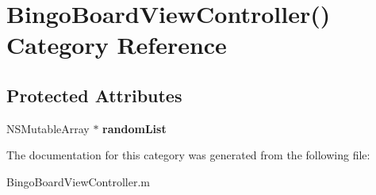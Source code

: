 \hypertarget{category_bingo_board_view_controller_07_08}{\section{Bingo\+Board\+View\+Controller() Category Reference}
\label{category_bingo_board_view_controller_07_08}
}
\subsection*{Protected Attributes}
\begin{DoxyCompactItemize}
\item 
\hypertarget{category_bingo_board_view_controller_07_08_a89433034a9e9f240b8b63ee5e4447135}{N\+S\+Mutable\+Array $\ast$ {\bfseries random\+List}}\label{category_bingo_board_view_controller_07_08_a89433034a9e9f240b8b63ee5e4447135}

\end{DoxyCompactItemize}


The documentation for this category was generated from the following file\+:\begin{DoxyCompactItemize}
\item 
Bingo\+Board\+View\+Controller.\+m\end{DoxyCompactItemize}
